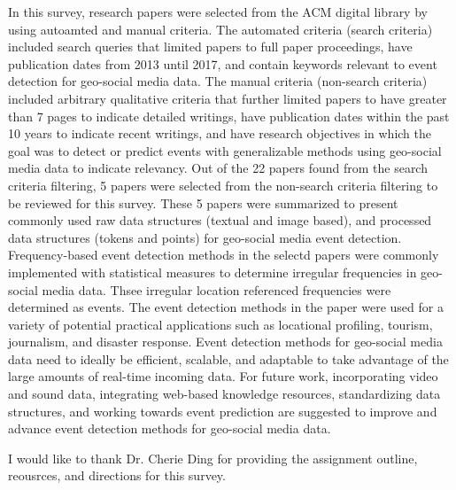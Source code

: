 In this survey, research papers were selected from the ACM digital library by using autoamted and manual criteria. The automated criteria (search criteria) included search queries that limited papers to full paper proceedings, have publication dates from 2013 until 2017, and contain keywords relevant to event detection for geo-social media data. The manual criteria (non-search criteria) included arbitrary qualitative criteria that further limited papers to have greater than 7 pages to indicate detailed writings, have publication dates within the past 10 years to indicate recent writings, and have research objectives in which the goal was to detect or predict events with generalizable methods using geo-social media data to indicate relevancy. Out of the 22 papers found from the search criteria filtering, 5 papers were selected from the non-search criteria filtering to be reviewed for this survey. These 5 papers were summarized to present commonly used raw data structures (textual and image based), and processed data structures (tokens and points) for geo-social media event detection. Frequency-based event detection methods in the selectd papers were commonly implemented with statistical measures to determine irregular frequencies in geo-social media data. Thsee irregular location referenced frequencies were determined as events. The event detection methods in the paper were used for a variety of potential practical applications such as locational profiling, tourism, journalism, and disaster response. Event detection methods for geo-social media data need to ideally be efficient, scalable, and adaptable to take advantage of the large amounts of real-time incoming data. For future work, incorporating video and sound data, integrating web-based knowledge resources, standardizing data structures, and working towards event prediction are suggested to improve and advance event detection methods for geo-social media data.

\begin{acks}
I would like to thank Dr. Cherie Ding for providing the assignment outline, reousrces, and directions for this survey.
\end{acks}



